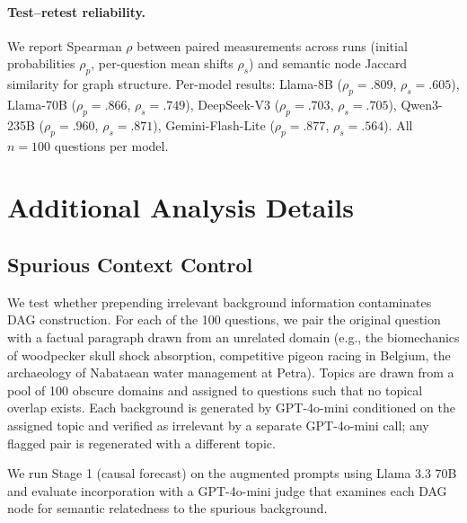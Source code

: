 \documentclass[11pt]{article}
\begin{document}
\paragraph{Test--retest reliability.} We report Spearman $\rho$ between paired measurements across runs (initial probabilities $\rho_p$, per-question mean shifts $\rho_s$) and semantic node Jaccard similarity for graph structure. Per-model results: Llama-8B ($\rho_p = .809$, $\rho_s = .605$), Llama-70B ($\rho_p = .866$, $\rho_s = .749$), DeepSeek-V3 ($\rho_p = .703$, $\rho_s = .705$), Qwen3-235B ($\rho_p = .960$, $\rho_s = .871$), Gemini-Flash-Lite ($\rho_p = .877$, $\rho_s = .564$). All $n = 100$ questions per model.

\section{Additional Analysis Details}
\label{app:additional}

\subsection{Spurious Context Control}

We test whether prepending irrelevant background information contaminates DAG construction. For each of the 100 questions, we pair the original question with a factual paragraph drawn from an unrelated domain (e.g., the biomechanics of woodpecker skull shock absorption, competitive pigeon racing in Belgium, the archaeology of Nabataean water management at Petra). Topics are drawn from a pool of 100 obscure domains and assigned to questions such that no topical overlap exists. Each background is generated by GPT-4o-mini conditioned on the assigned topic and verified as irrelevant by a separate GPT-4o-mini call; any flagged pair is regenerated with a different topic.

We run Stage 1 (causal forecast) on the augmented prompts using Llama 3.3 70B and evaluate incorporation with a GPT-4o-mini judge that examines each DAG node for semantic relatedness to the spurious background.
\end{document}
